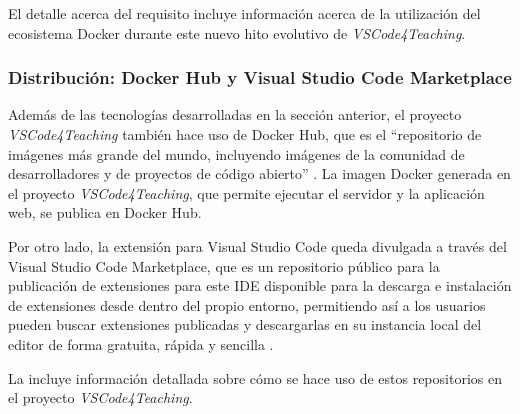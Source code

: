 El detalle acerca del requisito  incluye información acerca de la utilización del ecosistema Docker durante este nuevo hito evolutivo de \textit{VSCode4Teaching}.

\subsubsection{Distribución: Docker Hub y Visual Studio Code Marketplace}
\label{subsec:tecDistrib}
Además de las tecnologías desarrolladas en la sección anterior, el proyecto \textit{VSCode4Teaching} también hace uso de Docker Hub, que es el ``repositorio de imágenes más grande del mundo, incluyendo imágenes de la comunidad de desarrolladores y de proyectos de código abierto'' \cite{DockerHub}. La imagen Docker generada en el proyecto \textit{VSCode4Teaching}, que permite ejecutar el servidor y la aplicación web, se publica en Docker Hub.

Por otro lado, la extensión para Visual Studio Code queda divulgada a través del Visual Studio Code Marketplace, que es un repositorio público para la publicación de extensiones para este IDE disponible para la descarga e instalación de extensiones desde dentro del propio entorno, permitiendo así a los usuarios pueden buscar extensiones publicadas y descargarlas en su instancia local del editor de forma gratuita, rápida y sencilla \cite{VSCodeMarketplace}.

La  incluye información detallada sobre cómo se hace uso de estos repositorios en el proyecto \textit{VSCode4Teaching}.
